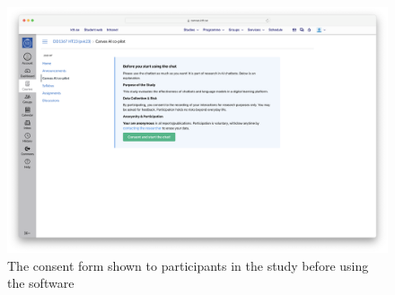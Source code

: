 \begin{figure}[H]
    \centering
    \includegraphics[width=\textwidth]{content/figures/assets/17-consent-form.png}
    \caption{The consent form shown to participants in the study before using the software}
    \label{fig:consent_form}
\end{figure}
